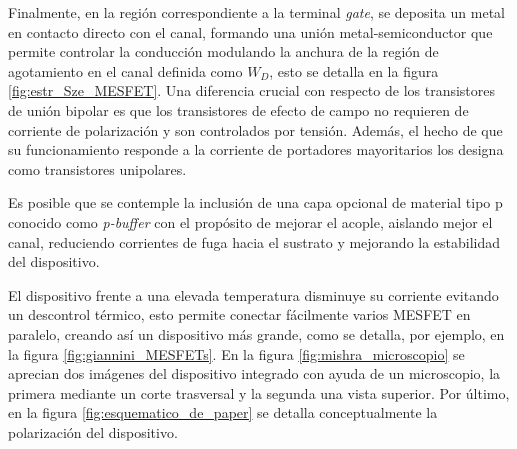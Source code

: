 \documentclass[a4paper]{article}
\begin{document}

       
    




Finalmente, en la región correspondiente a la terminal \textit{gate}, se deposita un metal en contacto directo con el canal, formando una unión metal-semiconductor que permite controlar la conducción modulando la anchura de la región de agotamiento en el canal definida como $W_D$, esto se detalla en la figura \ref{fig:estr_Sze_MESFET}. Una diferencia crucial con respecto de los transistores de unión bipolar es que los transistores de efecto de campo no requieren de corriente de polarización y son controlados por tensión. Además, el hecho de que su funcionamiento responde a la corriente de portadores mayoritarios los designa como transistores unipolares.



Es posible que se contemple la inclusión de una capa opcional de material tipo p conocido como \textit{p-buffer} con el propósito de mejorar el acople, aislando mejor el canal, reduciendo corrientes de fuga hacia el sustrato y mejorando la estabilidad del dispositivo.



El dispositivo frente a una elevada temperatura disminuye su corriente evitando un descontrol térmico, esto permite conectar fácilmente varios MESFET en paralelo, creando así un dispositivo más grande, como se detalla, por ejemplo, en la figura \ref{fig:giannini_MESFETs}. En la figura \ref{fig:mishra_microscopio} se aprecian dos imágenes del dispositivo integrado con ayuda de un microscopio, la primera mediante un corte trasversal y la segunda una vista superior. Por último, en la figura \ref{fig:esquematico_de_paper} se detalla conceptualmente la polarización del dispositivo.
\end{document}
